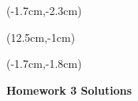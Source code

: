 \documentclass[12pt, oneside]{article}
\begin{document}
\begin{textblock*}{4cm}(-1.7cm,-2.3cm)
\end{textblock*}

\begin{textblock*}{8cm}(12.5cm,-1cm)
\end{textblock*}
\begin{textblock*}{13.5cm}(-1.7cm,-1.8cm)
\end{textblock*}

\vspace{1cm}

\begin{center}
\textbf{\Large Homework 3 Solutions}
\end{center}
\end{document}
